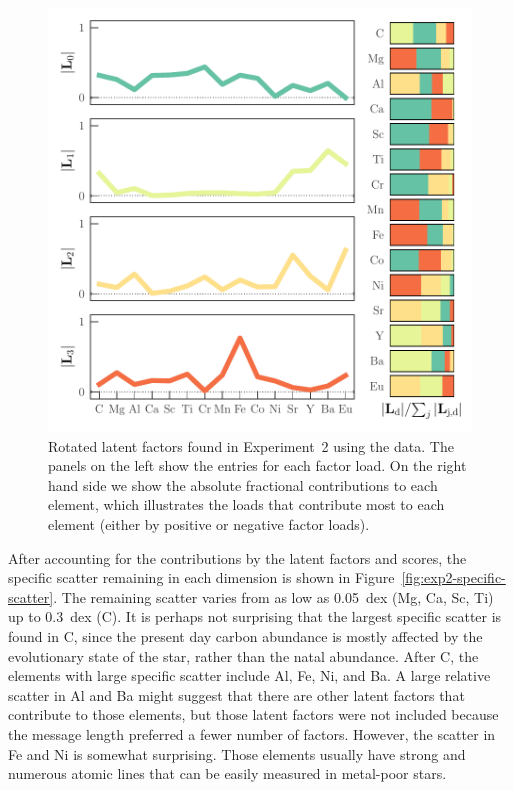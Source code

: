 \documentclass[twocolumn]{aastex62}
\begin{document}

\begin{figure}
	\includegraphics[width=\textwidth]{experiments/exp2-log-xfe-offset-latent-factors-visualize-abs.pdf}
	\caption{Rotated latent factors found in Experiment~2 using the \citet{Barklem:2005}
			 data. The panels on the left show the entries for each factor load. On
			 the right hand side we show the absolute fractional contributions to
			 each element, which illustrates the loads that contribute most to each
			 element (either by positive or negative factor loads).}
    \label{fig:exp2-factor-loads}
\end{figure}



After accounting for the contributions by the latent factors and scores,
the specific scatter remaining in each dimension is shown in
Figure~\ref{fig:exp2-specific-scatter}. The remaining scatter varies from as low 
as 0.05~dex (Mg, Ca, Sc, Ti) up to 0.3~dex (C). It is perhaps not surprising that
the largest specific scatter is found in C, since the present day carbon abundance
is mostly affected by the evolutionary state of the star, rather than the natal
abundance. After C, the elements with large specific scatter include Al, Fe, Ni, 
and Ba. A large relative scatter in Al and Ba might suggest that there are other latent
factors that contribute to those elements, but those latent factors were not included because
the message length preferred a fewer number of factors. However, the scatter in 
Fe and Ni is somewhat surprising. Those elements usually have strong and numerous atomic
lines that can be easily measured in metal-poor stars. 
\end{document}
